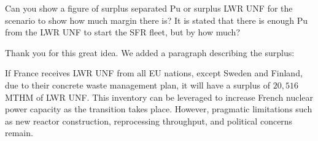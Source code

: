 \documentclass[answers,11pt]{exam}
\begin{document}
\begin{questions}
        \question Can you show a figure of surplus separated Pu or surplus LWR 
        UNF for the scenario to show how much margin there is? It is stated 
        that there is enough Pu from the LWR UNF to start the SFR fleet, but by 
        how much?
        \begin{solution}
	        	Thank you for this great idea.
                We added a paragraph describing the surplus:
                
                If France receives LWR UNF from all EU nations,
                except Sweden and Finland, due to their concrete waste management plan,
                it will have a surplus of $20,516$ MTHM of LWR UNF. This
                inventory can be leveraged to increase French nuclear power capacity as
                the transition takes place. However, pragmatic limitations such
                as new reactor construction, reprocessing throughput, and
                political concerns remain. 
                
        \end{solution}



\end{questions}


\end{document}
